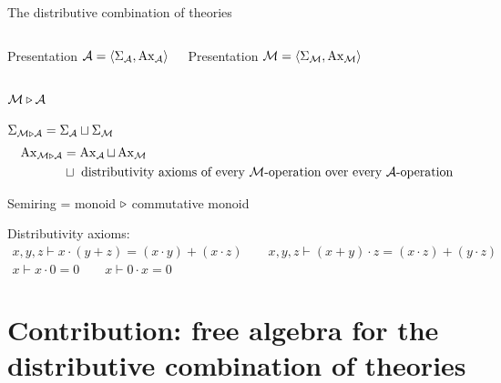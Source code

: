 \documentclass[10pt, english, xcolor={dvipsnames}]{beamer}
\begin{document}
\begin{frame}[t]{The distributive combination of theories}
  \begin{columns}

    Presentation $\mathcal{A} = \left\langle \Sigma_{\mathcal{A}}, \operatorname{Ax}_{\mathcal{A}} \right\rangle$


    Presentation $\mathcal{M} = \left\langle \Sigma_{\mathcal{M}}, \operatorname{Ax}_{\mathcal{M}} \right\rangle$
  \end{columns}
  \vspace{0.5cm}
   $\mathcal{M} \triangleright \mathcal{A}$

  $\Sigma_{\mathcal{M}\triangleright\mathcal{A}} = \Sigma_{\mathcal{A}} \sqcup \Sigma_{\mathcal{M}}$
  \begin{align*}
    \operatorname{Ax}_{\mathcal{M}\triangleright\mathcal{A}} &= \operatorname{Ax}_{\mathcal{A}} \sqcup \operatorname{Ax}_{\mathcal{M}}\\
    &\sqcup \text{ distributivity axioms of every $\mathcal{M}$-operation over every $\mathcal{A}$-operation}
  \end{align*}


  Semiring = monoid $\triangleright$ commutative monoid

  Distributivity axioms:
  \begin{gather*}
    x, y, z \vdash x \cdot (y + z) = (x \cdot y) + (x \cdot z) \qquad x, y, z \vdash (x + y) \cdot z = (x \cdot z) + (y \cdot z)\\
    x \vdash x \cdot 0 = 0 \qquad x \vdash 0 \cdot x = 0
  \end{gather*}
\end{frame}

\section{Contribution: free algebra for the distributive combination of theories}
\end{document}
